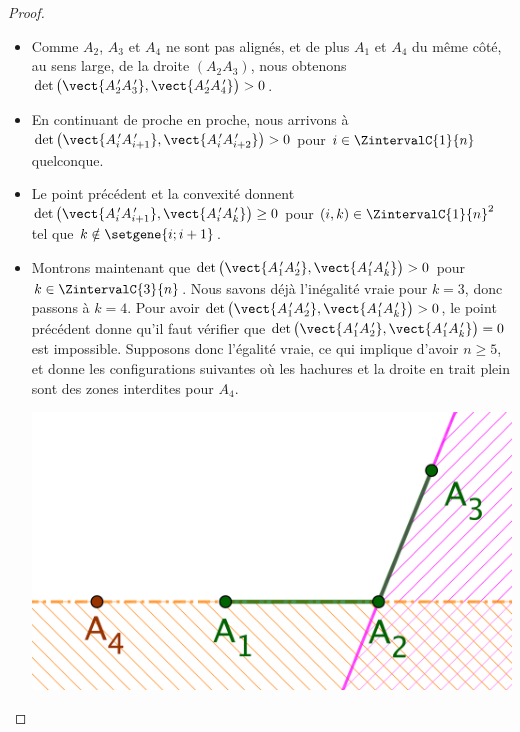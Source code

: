 \begin{proof}
\begin{itemize}
		\item Comme $A_2$, $A_3$ et $A_4$ ne sont pas alignés, et de plus $A_1$ et $A_4$ du même côté, au sens large, de la droite $(A_2 A_3)$, nous obtenons
		$\det \big( \vect{A^{\,\prime}_2 A^{\,\prime}_3}, \vect{A^{\,\prime}_2 A^{\,\prime}_4} \big) > 0$.


		\item En continuant de proche en proche, nous arrivons à
		$\det \big( \vect{A^{\,\prime}_i A^{\,\prime}_{i+1}}, \vect{A^{\,\prime}_i A^{\,\prime}_{i+2}} \big) > 0$
		pour $i \in \ZintervalC{1}{n}$ quelconque.


		\item Le point précédent et la convexité donnent
		$\det \big( \vect{A^{\,\prime}_i A^{\,\prime}_{i+1}}, \vect{A^{\,\prime}_i A^{\,\prime}_k} \big) \geq 0$
		pour $(i, k) \in \ZintervalC{1}{n}^2$ tel que $k \notin \setgene{i ; i+1}$.


		\item
		Montrons maintenant que
		$\det \big( \vect{A^{\,\prime}_1 A^{\,\prime}_2}, \vect{A^{\,\prime}_1 A^{\,\prime}_k} \big) > 0$
		pour $k \in \ZintervalC{3}{n}$.
		Nous savons déjà l'inégalité vraie pour $k = 3$, donc passons à $k = 4$.
		Pour avoir 
		$\det \big( \vect{A^{\,\prime}_1 A^{\,\prime}_2}, \vect{A^{\,\prime}_1 A^{\,\prime}_k} \big) > 0$, 
		le point précédent donne qu'il faut vérifier que 
		$\det \big( \vect{A^{\,\prime}_1 A^{\,\prime}_2}, \vect{A^{\,\prime}_1 A^{\,\prime}_k} \big) = 0$
		est impossible.
		Supposons donc l'égalité vraie, ce qui implique d'avoir $n \geq 5$, et donne les configurations suivantes où les hachures et la droite en trait plein sont des zones interdites pour $A_4$.

        \begin{multicols}{2}
            \small\itshape\centering
           	\includegraphics[scale=.4]{content/polygon/at-least-one/conv-det-A4-1.png}
        	    

\end{multicols}
\end{itemize}
\end{proof}
